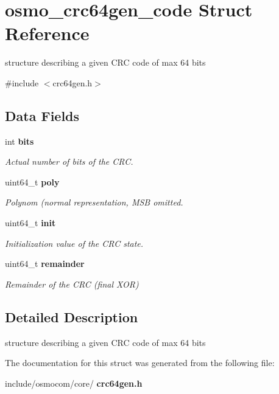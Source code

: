 \section{osmo\+\_\+crc64gen\+\_\+code Struct Reference}
\label{structosmo__crc64gen__code}


structure describing a given C\+RC code of max 64 bits  




{\ttfamily \#include $<$crc64gen.\+h$>$}

\subsection*{Data Fields}
\begin{DoxyCompactItemize}
\item 
\mbox{\label{structosmo__crc64gen__code_a564630c90a1088175bb62126f7c9b0c3}} 
int \textbf{ bits}
\begin{DoxyCompactList}\small\item\em Actual number of bits of the C\+RC. \end{DoxyCompactList}\item 
\mbox{\label{structosmo__crc64gen__code_abef85ea259654d573330a1fad0b7f969}} 
uint64\+\_\+t \textbf{ poly}
\begin{DoxyCompactList}\small\item\em Polynom (normal representation, M\+SB omitted. \end{DoxyCompactList}\item 
\mbox{\label{structosmo__crc64gen__code_a73757c2782b9d2e48a64a7d53ea605c3}} 
uint64\+\_\+t \textbf{ init}
\begin{DoxyCompactList}\small\item\em Initialization value of the C\+RC state. \end{DoxyCompactList}\item 
\mbox{\label{structosmo__crc64gen__code_a432d6a569fd5d86bb80a7f6fe9c954e4}} 
uint64\+\_\+t \textbf{ remainder}
\begin{DoxyCompactList}\small\item\em Remainder of the C\+RC (final X\+OR) \end{DoxyCompactList}\end{DoxyCompactItemize}


\subsection{Detailed Description}
structure describing a given C\+RC code of max 64 bits 

The documentation for this struct was generated from the following file\+:\begin{DoxyCompactItemize}
\item 
include/osmocom/core/\textbf{ crc64gen.\+h}\end{DoxyCompactItemize}
